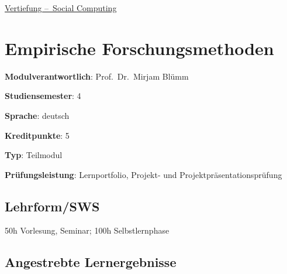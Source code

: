 \hyperref[/mi-2017/modulbeschreibungen-bachelor/BA_Vertiefung_SocialComputing]{Vertiefung – Social Computing}

\hypertarget{empirische-forschungsmethodenpathlabelmi-2017modulbeschreibungen-bachelorba_sc_empirische-forschungsmethoden}{%
\chapter{Empirische
Forschungsmethoden\label{/mi-2017/modulbeschreibungen-bachelor/BA_SC_empirische-forschungsmethoden}}\label{empirische-forschungsmethodenpathlabelmi-2017modulbeschreibungen-bachelorba_sc_empirische-forschungsmethoden}}

\begin{modulHead}
\textbf{Modulverantwortlich}: Prof.~Dr.~Mirjam
Blümm
\end{modulHead}
\begin{modulHead}
\textbf{Studiensemester}:
4
\end{modulHead}
\begin{modulHead}
\textbf{Sprache}:
deutsch
\end{modulHead}
\begin{modulHead}
\textbf{Kreditpunkte}:
5
\end{modulHead}
\begin{modulHead}
\textbf{Typ}:
Teilmodul
\end{modulHead}
\begin{modulHead}
\textbf{Prüfungsleistung}:
Lernportfolio, Projekt- und Projektpräsentationsprüfung
\end{modulHead}


\hypertarget{lehrformswspathlabelmi-2017modulbeschreibungen-bachelorba_sc_empirische-forschungsmethoden}{%
\section*{Lehrform/SWS\label{/mi-2017/modulbeschreibungen-bachelor/BA_SC_empirische-forschungsmethoden}}\label{lehrformswspathlabelmi-2017modulbeschreibungen-bachelorba_sc_empirische-forschungsmethoden}}

50h Vorlesung, Seminar; 100h Selbstlernphase

\hypertarget{angestrebte-lernergebnissepathlabelmi-2017modulbeschreibungen-bachelorba_sc_empirische-forschungsmethoden}{%
\section*{Angestrebte
Lernergebnisse\label{/mi-2017/modulbeschreibungen-bachelor/BA_SC_empirische-forschungsmethoden}}\label{angestrebte-lernergebnissepathlabelmi-2017modulbeschreibungen-bachelorba_sc_empirische-forschungsmethoden}}

